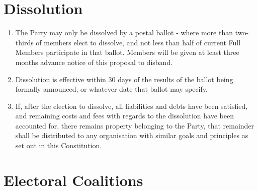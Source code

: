 \documentclass[a4paper,titlepage,8.5pt]{article}
\begin{document}
\section{Dissolution}

\begin{enumerate}
\item The Party may only be dissolved by a postal ballot - where more than two-thirds of members elect to dissolve, and not less than half of current Full Members participate in that ballot. Members will be given at least three months advance notice of this proposal to disband.
\item Dissolution is effective within 30 days of the results of the ballot being formally announced, or whatever date that ballot may specify.
\item If, after the election to dissolve, all liabilities and debts have been satisfied, and remaining costs and fees with regards to the dissolution have been accounted for, there remains property belonging to the Party, that remainder shall be distributed to any organisation with similar goals and principles as set out in this Constitution.
\end{enumerate}

\section{Electoral Coalitions}
\end{document}
